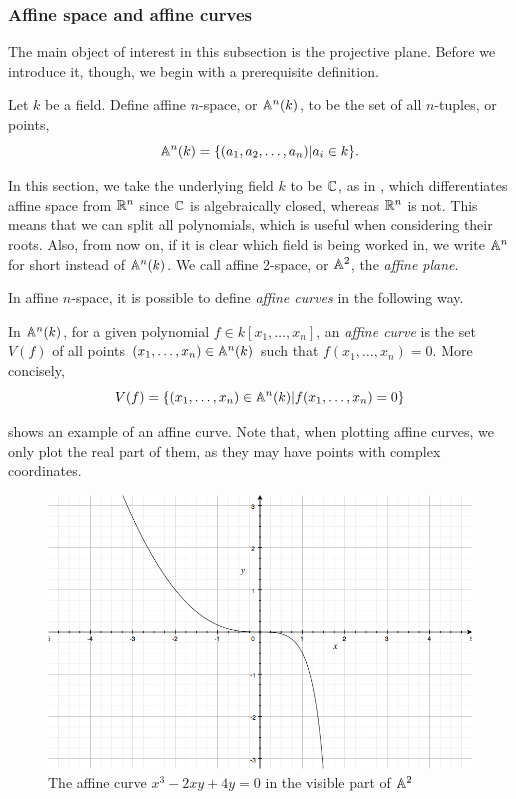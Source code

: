 \subsubsection{Affine space and affine curves}
The main object of interest in this subsection is the projective plane.
Before we introduce it, though, we begin with a prerequisite definition.

\begin{definition}
	Let $k$ be a field.
	Define affine $n$-space, or $\an(k)$, to be the set of all $n$-tuples, or points,
	$$\an(k) = \{ (a_1,a_2,\ldots,a_n) | a_i \in k\}.$$
\end{definition}

In this section, we take the underlying field $k$ to be $\C$, as in \cite{bix2006,323-lectures}, which differentiates affine space from $\R^n$ since $\C$ is algebraically closed, whereas $\R^n$ is not.
This means that we can split all polynomials, which is useful when considering their roots.
Also, from now on, if it is clear which field is being worked in, we write $\an$ for short instead of $\an(k)$.
We call affine 2-space, or $\an[2]$, the \emph{affine plane}.

In affine $n$-space, it is possible to define \emph{affine curves} in the following way.
\begin{definition}
	In $\an(k)$, for a given polynomial $f \in k[x_1,\ldots,x_n]$, an \emph{affine curve} is the set $V(f)$ of all points $(x_1,\ldots,x_n) \in \an(k)$ such that $f(x_1,\ldots,x_n)=0$.
	More concisely,
	$$V(f) = \{(x_1,\ldots,x_n)\in\an(k) | f(x_1,\ldots,x_n)=0\}$$
\end{definition}
 shows an example of an affine curve.
Note that, when plotting affine curves, we only plot the real part of them, as they may have points with complex coordinates.

\begin{figure}[htbp]
	\centering
	\includegraphics[scale=0.3]{../Figures/affineexample.jpg}
	\caption{The affine curve $x^3 - 2xy + 4y = 0$ in the visible part of $\an[2]$}
	\label{affinecurveexample}
\end{figure}

